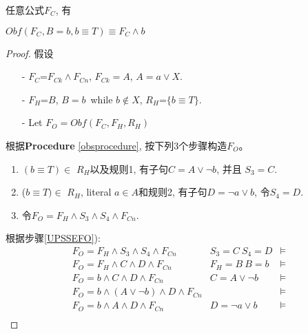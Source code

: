 \begin{lemma}\label{UPSSE-lemma}
任意公式$F_C$, 有

\textbf{$Obf(F_C,B=b,{b\equiv T})\equiv F_C\wedge b$}
\end{lemma}
\begin{proof}
假设
\begin{enumerate}
 \item[-]$F_C$=$F_{Ck} \wedge F_{Cn}$, $F_{Ck}=A$, $A=a\vee X$.
 \item[-]$F_H$=$B$, $B=b$~while $b\notin X$, $R_H$=$\{b\equiv T\}$.
 \item[-]Let $F_O=Obf(F_C,F_H,R_H)$
 \end{enumerate}
根据\textbf{Procedure} \ref{obsprocedure}, 按下列3个步骤构造$F_O$。
\begin{enumerate}
\item $(b\equiv T) \in $ $R_H$以及规则1,
有子句$C=A\vee \neg b$, 并且 $S_3=C$.
\item
($b\equiv T) \in $ $R_H$, literal $a\in A$和规则2,
有子句$D=\neg a\vee b$,
令$S_4=D$.
\item \label{UPSSEFO}
令$F_O=F_H \wedge S_3\wedge S_4 \wedge F_{Cn}$.
\end{enumerate}
根据步骤\ref{UPSSEFO}):
\begin{equation}
\begin{array}{ccc}
F_O  =  F_H \wedge S_3\wedge S_4\wedge F_{Cn}           &S_3=C~ S_4=D              &\models\\
F_O  =  F_H\wedge C\wedge D\wedge F_{Cn}                &F_H=B~ B=b                &\models\\
F_O  =  b\wedge C\wedge D\wedge F_{Cn}                  &C=A\vee \neg b~           &\models\\
F_O  =  b\wedge (A\vee \neg b) \wedge D\wedge F_{Cn}    &                          &\models\\
F_O  =  b\wedge A \wedge D\wedge F_{Cn}                 & D=\neg a\vee b~          &\models\\

\end{array}
\end{equation}
\end{proof}
